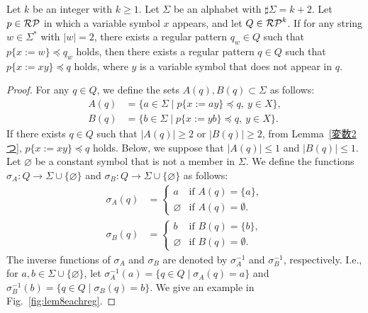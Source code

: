 \begin{lem}\label{追加補題1}
Let $k$ be an integer with $k\geq 1$.
Let $\Sigma$ be an alphabet with $\sharp \Sigma = k + 2$.
Let $p \in \mathcal{RP}$ in which a variable symbol $x$ appears, and let $Q \in \mathcal{RP}^{k}$.
If for any string $w \in \Sigma^{\ast}$ with $|w|=2$, there exists a regular pattern $q_{w} \in Q$ such that $p \{ x:=w \} \preceq q_{w}$ holds, then there exists a regular pattern $q \in Q$ such that $p \{ x:=xy \} \preceq q$ holds, where $y$ is a variable symbol that does not appear in $q$.
\end{lem}

\begin{proof}
For any $q \in Q$, we define the sets $A(q), B(q) \subset \Sigma$ as follows:
\begin{align*}
  A(q) & = \{ a \in \Sigma \mid p \{ x:=ay \} \preceq q,\ y\in X\},\\ 
  B(q) & = \{ b \in \Sigma \mid p \{ x:=yb \} \preceq q,\ y\in X\}.
  \end{align*}
If there exists $q\in Q$ such that $|A(q)|\geq 2$ or $|B(q)|\geq 2$, from Lemma~\ref{変数2つ}, $p\{x := xy\} \preceq q$ holds.
Below, we suppose that $|A(q)|\leq 1$ and $|B(q)|\leq 1$.
Let $\varnothing$ be a constant symbol that is not a member in $\Sigma$.
We define the functions $\sigma_{A}: Q \rightarrow \Sigma \cup \{\varnothing\}$ and $\sigma_{B}: Q \rightarrow \Sigma \cup \{\varnothing\}$ as follows:
\begin{align*}
  \sigma_{A}(q) & =
  \begin{cases}
    a & \textrm{if } A(q) = \{a\}, \\
    \varnothing & \textrm{if } A(q) = \emptyset.
  \end{cases}\\
  \sigma_{B}(q) & =
  \begin{cases}
    b & \textrm{if } B(q) = \{b\}, \\
    \varnothing & \textrm{if } B(q) = \emptyset.
  \end{cases}
\end{align*}
The inverse functions of $\sigma_{A}$ and $\sigma_{B}$ are denoted by $\sigma_{A}^{-1}$ and $\sigma_{B}^{-1}$, respectively. I.e., for $a,b \in \Sigma \cup \{\varnothing\}$, let $\sigma_{A}^{-1}(a) = \{q \in Q \mid \sigma_{A}(q) = a\}$ and $\sigma_{B}^{-1}(b) = \{q \in Q \mid \sigma_{B}(q) = b\}$. 
We give an example in Fig.~\ref{fig:lem8eachreg}.


\end{proof}
